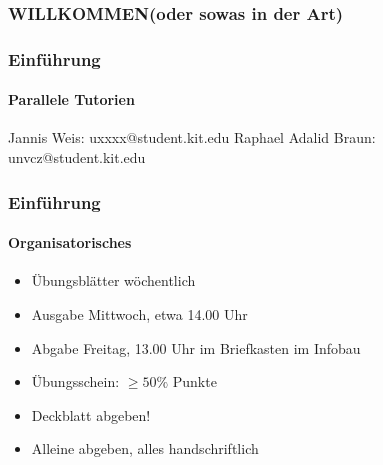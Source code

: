 \documentclass{beamer}
\begin{document}
	\begin{frame}
		\frametitle{WILLKOMMEN(oder sowas in der Art)}
	\end{frame}
	\begin{frame}
		\frametitle{Einführung}
		\framesubtitle{Parallele Tutorien}
		Jannis Weis: uxxxx@student.kit.edu
		Raphael Adalid Braun: unvcz@student.kit.edu
	\end{frame}
	\begin{frame}
		\frametitle{Einführung}
		\framesubtitle{Organisatorisches}
		\begin{itemize}
			\item Übungsblätter wöchentlich
			\item Ausgabe Mittwoch, etwa 14.00 Uhr
			\item Abgabe Freitag, 13.00 Uhr im Briefkasten im Infobau
			\item Übungsschein: $\geq50\%$ Punkte
			\item Deckblatt abgeben!
			\item Alleine abgeben, alles handschriftlich
		\end{itemize}
	\end{frame}
\end{document}
